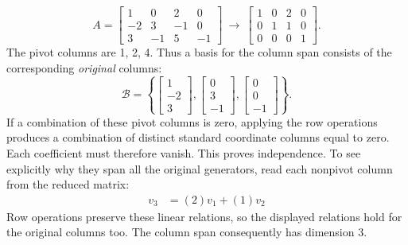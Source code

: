 \[A=\left[\begin{array}{rrrr}1&0&2&0\\-2&3&-1&0\\3&-1&5&-1\end{array}\right]\ \longrightarrow\ \left[\begin{array}{rrrr}1&0&2&0\\0&1&1&0\\0&0&0&1\end{array}\right].\]
The pivot columns are 1, 2, 4. Thus a basis for the column span consists of the corresponding \emph{original} columns:
\[\mathcal B=\left\{\left[\begin{array}{r}1\\-2\\3\end{array}\right],\left[\begin{array}{r}0\\3\\-1\end{array}\right],\left[\begin{array}{r}0\\0\\-1\end{array}\right]\right\}.\]
If a combination of these pivot columns is zero, applying the row operations produces a combination of distinct standard coordinate columns equal to zero. Each coefficient must therefore vanish. This proves independence. To see explicitly why they span all the original generators, read each nonpivot column from the reduced matrix:
\[\begin{aligned}v_{3}&=(2)v_{1}+(1)v_{2}\end{aligned}\]
Row operations preserve these linear relations, so the displayed relations hold for the original columns too. The column span consequently has dimension $3$.

